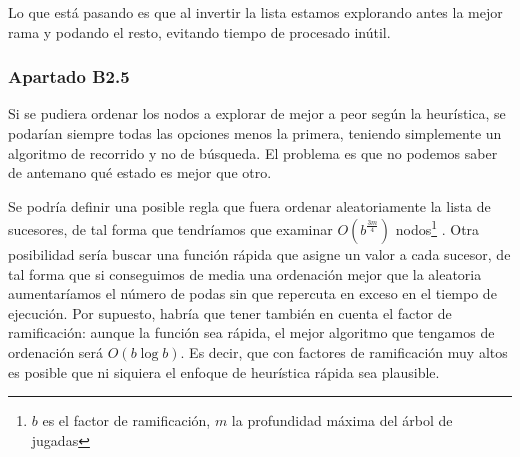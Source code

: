 \documentclass{apuntes}
\begin{document}
Lo que está pasando es que al invertir la lista estamos explorando antes la mejor rama y podando el resto, evitando tiempo de procesado inútil.

\subsubsection*{Apartado B2.5}
Si se pudiera ordenar los nodos a explorar de mejor a peor según la heurística, se podarían siempre todas las opciones menos la primera, teniendo simplemente un algoritmo de recorrido y no de búsqueda. El problema es que no podemos saber de antemano qué estado es mejor que otro.

Se podría definir una posible regla que fuera ordenar aleatoriamente la lista de sucesores, de tal forma que tendríamos que examinar $O(b^{\frac{3m}{4}})$ nodos\footnote{$b$ es el factor de ramificación, $m$ la profundidad máxima del árbol de jugadas} \citep[sec. 5.3.1]{russellAI}. Otra posibilidad sería buscar una función rápida que asigne un valor a cada sucesor, de tal forma que si conseguimos de media una ordenación mejor que la aleatoria aumentaríamos el número de podas sin que repercuta en exceso en el tiempo de ejecución. Por supuesto, habría que tener también en cuenta el factor de ramificación: aunque la función sea rápida, el mejor algoritmo que tengamos de ordenación será $O ( b \log b)$. Es decir, que con factores de ramificación muy altos es posible que ni siquiera el enfoque de heurística rápida sea plausible.



\end{document}
